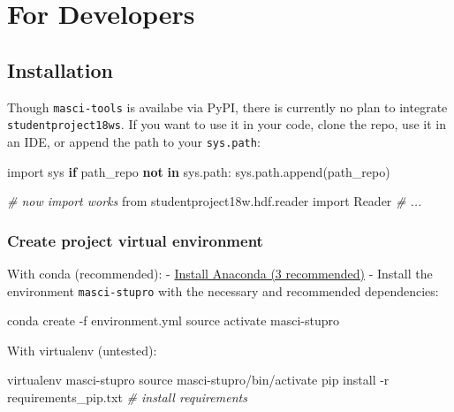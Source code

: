 \documentclass[]{article}
\newenvironment{Shaded}{}{}
\newcommand{\KeywordTok}[1]{\textcolor[rgb]{0.00,0.44,0.13}{\textbf{#1}}}
\newcommand{\ImportTok}[1]{#1}
\newcommand{\CommentTok}[1]{\textcolor[rgb]{0.38,0.63,0.69}{\textit{#1}}}
\newcommand{\ControlFlowTok}[1]{\textcolor[rgb]{0.00,0.44,0.13}{\textbf{#1}}}
\newcommand{\BuiltInTok}[1]{#1}
\newcommand{\ExtensionTok}[1]{#1}
\newcommand{\NormalTok}[1]{#1}
\begin{document}
\section{For Developers}\label{for-developers}

\subsection{Installation}\label{installation-1}

Though \texttt{masci-tools} is availabe via PyPI, there is currently no
plan to integrate \texttt{studentproject18ws}. If you want to use it in
your code, clone the repo, use it in an IDE, or append the path to your
\texttt{sys.path}:

\begin{Shaded}
\begin{Highlighting}[]
\ImportTok{import}\NormalTok{ sys}
\ControlFlowTok{if}\NormalTok{ path_repo }\KeywordTok{not} \KeywordTok{in}\NormalTok{ sys.path:}
\NormalTok{    sys.path.append(path_repo)}
    
\CommentTok{# now import works}
\ImportTok{from}\NormalTok{ studentproject18w.hdf.reader }\ImportTok{import}\NormalTok{ Reader}
\CommentTok{# ...}
\end{Highlighting}
\end{Shaded}

\subsubsection{Create project virtual
environment}\label{create-project-virtual-environment}

With conda (recommended): -
\href{https://www.anaconda.com/download}{Install Anaconda (3
recommended)} - Install the environment \texttt{masci-stupro} with the
necessary and recommended dependencies:

\begin{Shaded}
\begin{Highlighting}[]
\ExtensionTok{conda}\NormalTok{ create -f environment.yml}
\BuiltInTok{source}\NormalTok{ activate masci-stupro}
\end{Highlighting}
\end{Shaded}

With virtualenv (untested):

\begin{Shaded}
\begin{Highlighting}[]
\ExtensionTok{virtualenv}\NormalTok{ masci-stupro}
\BuiltInTok{source}\NormalTok{ masci-stupro/bin/activate}
\ExtensionTok{pip}\NormalTok{ install -r requirements_pip.txt }\CommentTok{# install requirements}
\end{Highlighting}
\end{Shaded}
\end{document}
